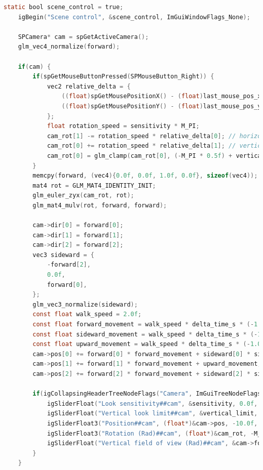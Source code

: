 \documentclass[oneside]{ausarbeitung}
\begin{document}
\begin{lstlisting}[language=C, label={lst:full_example}, caption={Kompletter C99-Quellcode zur Erstellung einer interaktiven 3D-Szene mit der \textbf{spider}-Engine}]
    static bool scene_control = true;
    igBegin("Scene control", &scene_control, ImGuiWindowFlags_None);
    
    SPCamera* cam = spGetActiveCamera();
    glm_vec4_normalize(forward);

    if(cam) {
        if(spGetMouseButtonPressed(SPMouseButton_Right)) {
            vec2 relative_delta = {
                ((float)spGetMousePositionX() - (float)last_mouse_pos_x) / (float) surface_width,
                ((float)spGetMousePositionY() - (float)last_mouse_pos_y) / (float) surface_height
            };
            float rotation_speed = sensitivity * M_PI;
            cam_rot[1] -= rotation_speed * relative_delta[0]; // horizontal
            cam_rot[0] += rotation_speed * relative_delta[1]; // vertical
            cam_rot[0] = glm_clamp(cam_rot[0], (-M_PI * 0.5f) + vertical_limit, (M_PI * 0.5f) - vertical_limit);
        }
        memcpy(forward, (vec4){0.0f, 0.0f, 1.0f, 0.0f}, sizeof(vec4));
        mat4 rot = GLM_MAT4_IDENTITY_INIT;
        glm_euler_zyx(cam_rot, rot);
        glm_mat4_mulv(rot, forward, forward);

        cam->dir[0] = forward[0];
        cam->dir[1] = forward[1];
        cam->dir[2] = forward[2];
        vec3 sideward = {
            -forward[2],
            0.0f,
            forward[0],
        };
        glm_vec3_normalize(sideward);
        const float walk_speed = 2.0f;
        const float forward_movement = walk_speed * delta_time_s * (-1.0f * spGetKeyPressed(SPKey_S) + spGetKeyPressed(SPKey_W));
        const float sideward_movement = walk_speed * delta_time_s * (-1.0f * spGetKeyPressed(SPKey_A) + spGetKeyPressed(SPKey_D));
        const float upward_movement = walk_speed * delta_time_s * (-1.0f * spGetKeyPressed(SPKey_ControlLeft) + spGetKeyPressed(SPKey_Space));
        cam->pos[0] += forward[0] * forward_movement + sideward[0] * sideward_movement;
        cam->pos[1] += forward[1] * forward_movement + upward_movement;
        cam->pos[2] += forward[2] * forward_movement + sideward[2] * sideward_movement;
        
        if(igCollapsingHeaderTreeNodeFlags("Camera", ImGuiTreeNodeFlags_None)) {
            igSliderFloat("Look sensitivity##cam", &sensitivity, 0.0f, 5.0f, "%.1f", 1.0f);
            igSliderFloat("Vertical look limit##cam", &vertical_limit, 0.0f, M_PI * 0.5f, "%.2f", 1.0f);
            igSliderFloat3("Position##cam", (float*)&cam->pos, -10.0f, 10.0f, "%.2f", 1.0f);
            igSliderFloat3("Rotation (Rad)##cam", (float*)&cam_rot, -M_PI, M_PI, "%.2f", 1.0f);
            igSliderFloat("Vertical field of view (Rad)##cam", &cam->fovy, 0.01f, M_PI, "%.2f", 1.0f);
        }
    }


\end{lstlisting}
\end{document}
